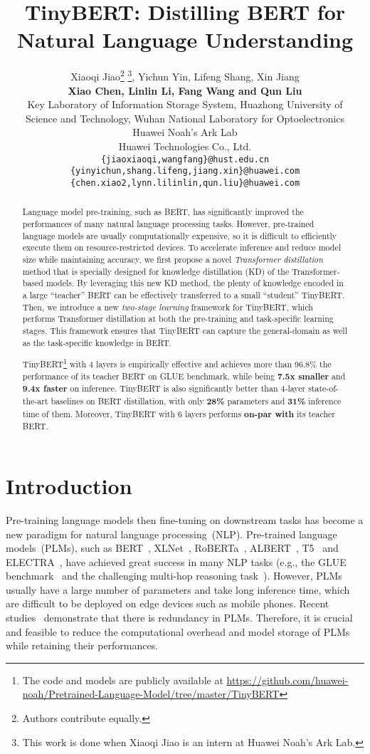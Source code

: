 \documentclass[11pt,a4paper]{article}
\title{TinyBERT: Distilling BERT for Natural Language Understanding}
\author{Xiaoqi Jiao\thanks{\hspace{0.3pt} Authors contribute equally.} \hspace{0.3pt}\thanks{\hspace{0.3pt} This work is done when Xiaoqi Jiao is an intern at Huawei Noah's Ark Lab.}, Yichun Yin, Lifeng Shang, Xin Jiang\\
\textbf{Xiao Chen, Linlin Li, Fang Wang and Qun Liu}\\
Key Laboratory of Information Storage System, Huazhong University of\\ Science and Technology, Wuhan National Laboratory for Optoelectronics\\
Huawei Noah's Ark Lab\\
Huawei Technologies Co., Ltd.\\
\texttt{\{jiaoxiaoqi,wangfang\}@hust.edu.cn}\\
\texttt{\{yinyichun,shang.lifeng,jiang.xin\}@huawei.com}\\
\texttt{\{chen.xiao2,lynn.lilinlin,qun.liu\}@huawei.com}
}
\date{}
\begin{document}
\maketitle

\begin{abstract}
Language model pre-training, such as BERT, has significantly improved the performances of many natural language processing tasks. However, pre-trained language models are usually computationally expensive, so it is difficult to efficiently execute them on resource-restricted devices. To accelerate inference and reduce model size while maintaining accuracy, we first propose a novel {\it Transformer distillation} method that is specially designed for knowledge distillation (KD) of the Transformer-based models. By leveraging this new KD method, the plenty of knowledge encoded in a large ``teacher'' BERT can be effectively transferred to a small ``student'' TinyBERT. Then, we introduce a new {\it two-stage learning} framework for TinyBERT, which performs Transformer distillation at both the pre-training and task-specific learning stages. This framework ensures that TinyBERT can capture the general-domain as well as the task-specific knowledge in BERT.

TinyBERT\footnote{The code and models are publicly available at \url{https://github.com/huawei-noah/Pretrained-Language-Model/tree/master/TinyBERT}} with 4 layers is empirically effective and achieves more than 96.8\% the performance of its teacher BERT on GLUE benchmark, while being {\bf 7.5x smaller} and {\bf 9.4x faster} on inference. TinyBERT is also significantly better than 4-layer state-of-the-art baselines on BERT distillation, with only {\bf 28\%} parameters and {\bf 31\%} inference time of them. Moreover, TinyBERT with 6 layers performs {\bf on-par with} its teacher BERT.
\end{abstract}  
\section{Introduction}\label{sec:intro}
Pre-training language models then fine-tuning on downstream tasks has become a new paradigm for natural language processing~(NLP). Pre-trained language models~(PLMs), such as BERT~\cite{devlin2019bert}, XLNet~\cite{yang2019xlnet}, RoBERTa~\cite{liu2019roberta}, ALBERT~\cite{Lan2020ALBERT}, T5~\cite{raffel2019exploring} and ELECTRA~\cite{clark2020electra}, have achieved great success in many NLP tasks (e.g., the GLUE benchmark~\cite{wang2018glue} and the challenging multi-hop reasoning task~\cite{ding2019cognitive}). 
However, PLMs usually have a large number of parameters and take long inference time, which are difficult to be deployed on edge devices such as mobile phones. Recent studies~\cite{kovaleva2019revealing,michel2019sixteen,voita2019analyzing} demonstrate that there is redundancy in PLMs. Therefore, it is crucial and feasible to reduce the computational overhead and model storage of PLMs while retaining their performances. 
\end{document}
